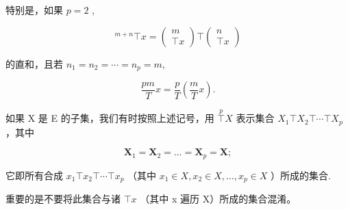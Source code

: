 特别是，如果 \(p = 2\) ,

\[
{ } ^ { m + n } \top x = \left( \begin{array} { c } m \\ \top x \end{array} \right) \top \left( \begin{array} { c } n \\ \top x \end{array} \right)\tag{4}
\]

的直和，且若 \(n_1 = n_2 = \cdots = n_p = m,\)

\[
\frac {p m}{T} x = \frac {p}{T} \left(\frac {m}{T} x\right).\tag{5}
\]

如果 X 是 E 的子集，我们有时按照上述记号，用 \(\overset{p}{\top}X\) 表示集合 \(X_{1}\top X_{2}\top\cdots\top X_{p}\) ，其中

\[
\mathbf {X} _ {1} = \mathbf {X} _ {2} = \dots = \mathbf {X} _ {p} = \mathbf {X};
\]

它即所有合成 \(x_{1} \top x_{2} \top \cdots \top x_{p}\) （其中 \(x_{1} \in X, x_{2} \in X, \ldots, x_{p} \in X\) ）所成的集合.

重要的是不要将此集合与诸 \(\top x\) （其中 x 遍历 X）所成的集合混淆。

